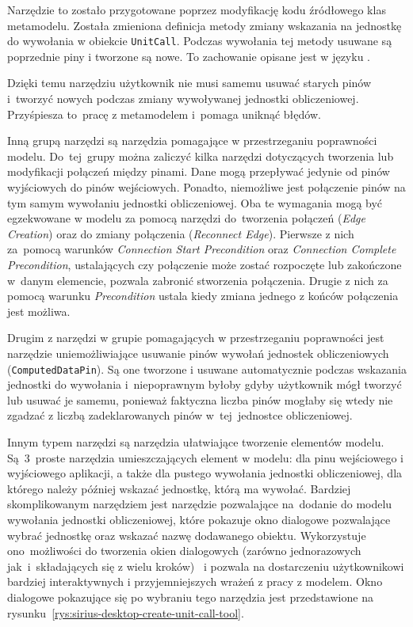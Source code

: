 Narzędzie to zostało przygotowane poprzez modyfikację kodu źródłowego klas
metamodelu. Została zmieniona definicja metody zmiany wskazania na jednostkę do
wywołania w obiekcie \texttt{UnitCall}. Podczas wywołania tej metody usuwane są
poprzednie piny i tworzone są nowe. To zachowanie opisane jest w języku
\Java{}.

Dzięki temu narzędziu użytkownik nie musi samemu usuwać starych pinów
i~tworzyć nowych podczas zmiany wywoływanej jednostki obliczeniowej.
Przyśpiesza to~pracę z
metamodelem i~pomaga uniknąć błędów.

Inną grupą narzędzi są narzędzia pomagające w przestrzeganiu poprawności
modelu. Do~tej~grupy można zaliczyć kilka narzędzi dotyczących tworzenia lub
modyfikacji połączeń między pinami. Dane mogą przepływać jedynie od pinów
wyjściowych do pinów wejściowych. Ponadto, niemożliwe jest połączenie pinów
na tym samym wywołaniu jednostki obliczeniowej. Oba te wymagania mogą być
egzekwowane w modelu za pomocą narzędzi do~tworzenia połączeń (\emph{Edge
	Creation}) oraz do zmiany połączenia (\emph{Reconnect Edge}). Pierwsze
z nich za~pomocą warunków \emph{Connection Start Precondition} oraz
\emph{Connection Complete Precondition}, ustalających czy połączenie może
zostać
rozpoczęte lub zakończone w~danym elemencie, pozwala zabronić stworzenia
połączenia. Drugie z nich za pomocą warunku \emph{Precondition} ustala kiedy
zmiana jednego z końców połączenia jest możliwa.

Drugim z narzędzi w grupie pomagających w przestrzeganiu poprawności jest
narzędzie uniemożliwiające usuwanie pinów wywołań jednostek obliczeniowych
(\texttt{ComputedDataPin}). Są one tworzone i usuwane automatycznie podczas
wskazania jednostki do wywołania i~niepoprawnym byłoby gdyby użytkownik mógł
tworzyć lub usuwać je samemu, ponieważ faktyczna liczba pinów mogłaby się
wtedy nie
zgadzać z liczbą zadeklarowanych pinów w~tej~jednostce obliczeniowej.

Innym typem narzędzi są narzędzia ułatwiające tworzenie elementów modelu.
Są~3~proste narzędzia umieszczających element w modelu: dla pinu wejściowego i
wyjściowego aplikacji, a także dla pustego wywołania jednostki obliczeniowej,
dla
którego należy później wskazać jednostkę, którą ma wywołać. Bardziej
skomplikowanym
narzędziem jest narzędzie pozwalające na~dodanie do modelu wywołania jednostki
obliczeniowej, które pokazuje okno dialogowe pozwalające wybrać jednostkę oraz
wskazać nazwę dodawanego obiektu. Wykorzystuje ono~możliwości \SiriusDesktop{}
do tworzenia okien dialogowych (zarówno jednorazowych
jak~i~składających się z wielu
kroków)~\cite{sirius-desktop-documentation-tools} i
pozwala na dostarczeniu użytkownikowi
bardziej interaktywnych i przyjemniejszych wrażeń z pracy z modelem. Okno
dialogowe
pokazujące się po wybraniu
tego narzędzia jest przedstawione na
rysunku~\ref{rys:sirius-desktop-create-unit-call-tool}.

